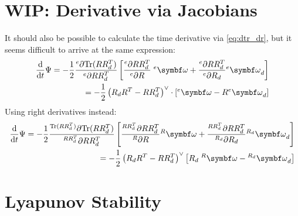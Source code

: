\section{WIP: Derivative via Jacobians}

It should also be possible to calculate the time derivative via \eqref{eq:dtr_dr}, but it seems difficult to arrive at the same expression:
\begin{equation}
  \begin{aligned}
    \frac{\mathrm{d}}{\mathrm{d}t} \Psi = -\frac{1}{2} \frac{^e\partial \tr(R R_d^T)}{^e \partial R R_d^T} \left[ \frac{^e\partial R R_d^T}{^e \partial R} \; {^e\bomega} + \frac{^e\partial R R_d^T}{^e \partial R_d}  {^e\bomega_d}  \right] \\
    = -\frac{1}{2} \left( R_d R^T - R  R_d^T \right)^\vee \cdot \left[ {^e\bomega} - R {^e\bomega_d}  \right]
  \end{aligned}
\end{equation}
Using right derivatives instead:
\begin{equation}
  \begin{aligned}
    \frac{\mathrm{d}}{\mathrm{d}t} \Psi = -\frac{1}{2} \frac{^{\tr(R R_d^T)} \partial \tr(R R_d^T)}{^{R R_d^T} \partial R R_d^T} \left[ \frac{^{R R_d^T} \partial R R_d^T}{^R \partial R}  {^R\bomega} + \frac{^{R R_d^T}\partial R R_d^T}{^{R_d} \partial R_d} {^{R_d} \bomega_d}  \right] \\
    = -\frac{1}{2} \left( R_d R^T - R R_d^T \right)^\vee \left[ R_d \; {^R\bomega} - {^{R_d}\bomega_d}  \right]
  \end{aligned}
\end{equation}



\section{Lyapunov Stability}

